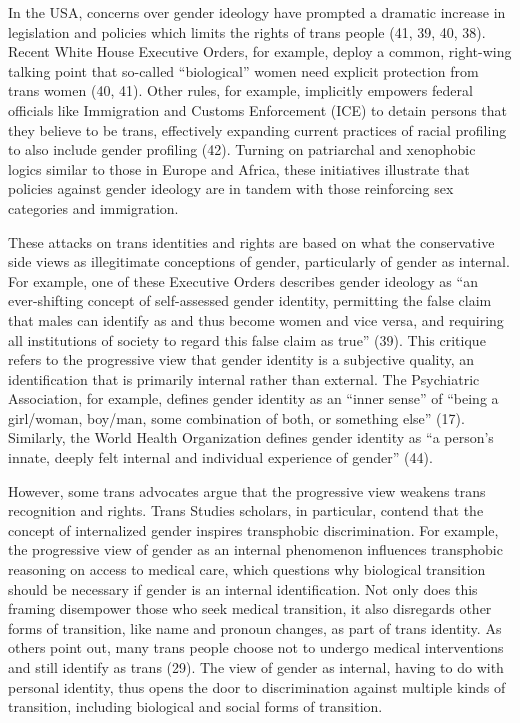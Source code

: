\documentclass[11pt]{article}
\begin{document}
In the USA, concerns over gender ideology have prompted a dramatic increase in legislation and policies which limits the rights of trans people (41, 39, 40, 38). Recent White House Executive Orders, for example, deploy a common, right-wing talking point that so-called “biological” women need explicit protection from trans women (40, 41). Other rules, for example, implicitly empowers federal officials like Immigration and Customs Enforcement (ICE) to detain persons that they believe to be trans, effectively expanding current practices of racial profiling to also include gender profiling (42). Turning on patriarchal and xenophobic logics similar to those in Europe and Africa, these initiatives illustrate that policies against gender ideology are in tandem with those reinforcing sex categories and immigration. 

These attacks on trans identities and rights are based on what the conservative side views as illegitimate conceptions of gender, particularly of gender as internal. For example, one of these Executive Orders describes gender ideology as “an ever-shifting concept of self-assessed gender identity, permitting the false claim that males can identify as and thus become women and vice versa, and requiring all institutions of society to regard this false claim as true” (39). This critique refers to the progressive view that gender identity is a subjective quality, an identification that is primarily internal rather than external. The Psychiatric Association, for example, defines gender identity as an “inner sense” of  “being a girl/woman, boy/man, some combination of both, or something else” (17). Similarly, the World Health Organization defines gender identity as “a person’s innate, deeply felt internal and individual experience of gender” (44).

However, some trans advocates argue that the progressive view weakens trans recognition and rights. Trans Studies scholars, in particular, contend that the concept of internalized gender inspires transphobic discrimination. For example, the progressive view of gender as an internal phenomenon influences transphobic reasoning on access to medical care, which questions why biological transition should be necessary if gender is an internal identification. Not only does this framing disempower those who seek medical transition, it also disregards other forms of transition, like name and pronoun changes, as part of trans identity. As others point out, many trans people choose not to undergo medical interventions and still identify as trans (29). The view of gender as internal, having to do with personal identity, thus opens the door to discrimination against multiple kinds of transition, including biological and social forms of transition.
\end{document}
